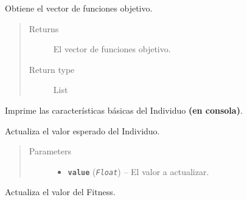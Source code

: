 \documentclass[class=report, crop=false]{standalone}
\begin{document}
\begin{fulllineitems}
\begin{fulllineitems}

Obtiene el vector de funciones objetivo.

\begin{quote}\begin{description}
\item[{Returns}] \leavevmode
El vector de funciones objetivo.
\item[{Return type}] \leavevmode
List
\end{description}\end{quote}

\end{fulllineitems}

\begin{fulllineitems}

Imprime las características básicas del 
Individuo \textbf{(en consola)}.

\end{fulllineitems}

\begin{fulllineitems}

Actualiza el valor esperado del Individuo.

\begin{quote}\begin{description}
\item[{Parameters}] \leavevmode\begin{itemize}
\item \textbf{\texttt{value}} (\emph{\texttt{Float}}) -- El valor a actualizar.
\end{itemize}
\end{description}\end{quote}

\end{fulllineitems}

\begin{fulllineitems}

Actualiza el valor del Fitness.
\begin{quote}\begin{description}


\end{description}
\end{quote}
\end{fulllineitems}
\end{fulllineitems}
\end{document}
